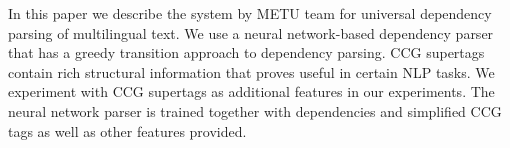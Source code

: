 In this paper we describe the system by METU team for universal dependency parsing of multilingual text. We use a neural network-based dependency parser that has a greedy transition approach to dependency parsing. CCG supertags contain rich structural information that proves useful in certain NLP tasks. We experiment with CCG supertags as additional features in our experiments. The neural network parser is trained together with dependencies and simplified CCG tags as well as other features provided.
